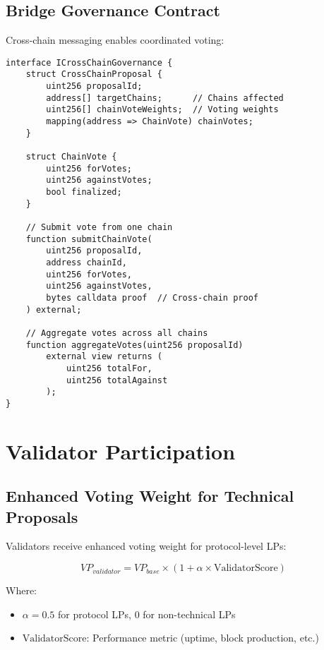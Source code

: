 \documentclass[11pt,a4paper]{article}
\begin{document}
\subsection{Bridge Governance Contract}

Cross-chain messaging enables coordinated voting:

\begin{lstlisting}[language=Solidity,caption=Cross-chain governance bridge]
interface ICrossChainGovernance {
    struct CrossChainProposal {
        uint256 proposalId;
        address[] targetChains;      // Chains affected
        uint256[] chainVoteWeights;  // Voting weights
        mapping(address => ChainVote) chainVotes;
    }

    struct ChainVote {
        uint256 forVotes;
        uint256 againstVotes;
        bool finalized;
    }

    // Submit vote from one chain
    function submitChainVote(
        uint256 proposalId,
        address chainId,
        uint256 forVotes,
        uint256 againstVotes,
        bytes calldata proof  // Cross-chain proof
    ) external;

    // Aggregate votes across all chains
    function aggregateVotes(uint256 proposalId)
        external view returns (
            uint256 totalFor,
            uint256 totalAgainst
        );
}
\end{lstlisting}

\section{Validator Participation}

\subsection{Enhanced Voting Weight for Technical Proposals}

Validators receive enhanced voting weight for protocol-level LPs:

\begin{equation}
VP_{validator} = VP_{base} \times (1 + \alpha \times \text{ValidatorScore})
\end{equation}

Where:
\begin{itemize}
\item $\alpha = 0.5$ for protocol LPs, $0$ for non-technical LPs
\item $\text{ValidatorScore}$: Performance metric (uptime, block production, etc.)
\end{itemize}
\end{document}
